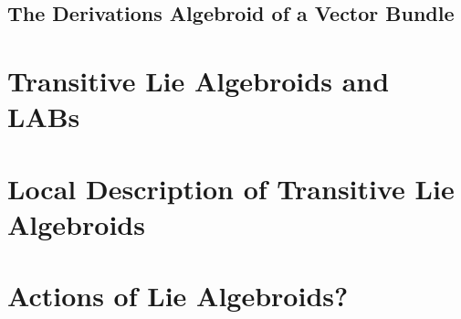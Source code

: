 \subsection{The Derivations Algebroid of a Vector Bundle}

\section{Transitive Lie Algebroids and LABs}

\section{Local Description of Transitive Lie Algebroids}

\section{Actions of Lie Algebroids?}